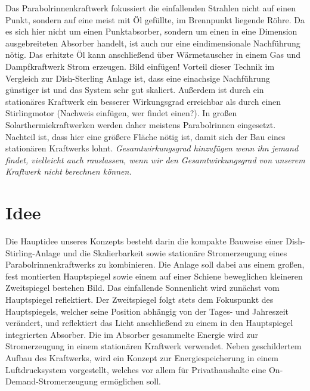 \documentclass[fontsize=10pt,paper=a4,bibliography=totoc]{scrartcl}
\newcommand{\maxim}[1]{{ \color{blue} #1}}
\newcommand{\todo}[1]{{\color{magenta}#1}}
\begin{document}
Das Parabolrinnenkraftwerk fokussiert die einfallenden Strahlen nicht auf einen Punkt, sondern auf eine meist mit Öl gefüllte, im Brennpunkt liegende Röhre. Da es sich hier nicht um einen Punktabsorber, sondern um einen in eine Dimension ausgebreiteten Absorber handelt, ist auch nur eine eindimensionale Nachführung nötig. Das erhitzte Öl kann anschließend über Wärmetauscher in einem Gas und Dampfkraftwerk Strom erzeugen. Bild einfügen! Vorteil dieser Technik im Vergleich zur Dish-Sterling Anlage ist, dass eine einachsige Nachführung günstiger ist und das System sehr gut skaliert. Außerdem ist durch ein stationäres Kraftwerk ein besserer Wirkungsgrad erreichbar als durch einen Stirlingmotor (Nachweis einfügen, wer findet einen?). In großen Solarthermiekraftwerken werden daher meistens Parabolrinnen eingesetzt. Nachteil ist, dass hier eine größere Fläche nötig ist, damit sich der Bau eines stationären Kraftwerks lohnt.
\emph{Gesamtwirkungsgrad hinzufügen wenn ihn jemand findet, vielleicht auch rauslassen, wenn wir den Gesamtwirkungsgrad von unserem Kraftwerk nicht berechnen können.}

\section{Idee}

\maxim{
Die Hauptidee unseres Konzepts besteht darin die kompakte Bauweise einer Dish-Stirling-Anlage und die Skalierbarkeit sowie stationäre Stromerzeugung eines Parabolrinnenkraftwerks zu kombinieren. Die Anlage soll dabei aus einem großen, fest montierten Hauptspiegel sowie einem auf einer Schiene beweglichen kleineren Zweitspiegel bestehen \todo{Bild}. Das einfallende Sonnenlicht wird zunächst vom Hauptspiegel reflektiert. Der Zweitspiegel folgt stets dem Fokuspunkt des Hauptspiegels, welcher seine Position abhängig von der Tages- und Jahreszeit verändert, und reflektiert das Licht anschließend zu einem in den Hauptspiegel integrierten Absorber.  Die im Absorber gesammelte Energie wird zur Stromerzeugung in einem stationären Kraftwerk verwendet.
\hfill\newline
\hfill\newline
Neben geschildertem Aufbau des Kraftwerks, wird ein Konzept zur Energiespeicherung in einem Luftdrucksystem vorgestellt, welches vor allem für Privathaushalte eine On-Demand-Stromerzeugung ermöglichen soll.
}
\hfill \newline
\end{document}

